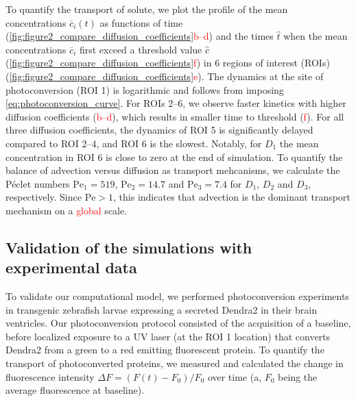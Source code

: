 \documentclass[fleqn]{wlscirep}
\newcommand{\cbar}{\overline{c}}
\newcommand{\fixme}[1]{\textcolor{red}{#1}}
\begin{document}
To quantify the transport of solute, we plot the profile of the mean
concentrations $\cbar_i(t)$ as functions of time
(\cref{fig:figure2_compare_diffusion_coefficients}\fixme{b--d}) and
the times $\hat{t}$ when the mean concentrations $\cbar_i$ first exceed
a threshold value $\hat{c}$ (\cref{fig:figure2_compare_diffusion_coefficients}\fixme{f})
in 6 regions of interest (ROIs) (\cref{fig:figure2_compare_diffusion_coefficients}\fixme{e}).
The dynamics at the site of photoconversion (ROI 1)
is logarithmic and follows from imposing \eqref{eq:photoconversion_curve}.
For ROIs 2--6, we observe faster kinetics with higher diffusion coefficients
(\fixme{b--d}),
which results in smaller time to threshold
(\fixme{f}).
For all three diffusion coefficients, the dynamics of ROI 5
is significantly delayed compared to ROI 2--4,
and ROI 6 is the slowest. Notably, for $D_1$ the mean concentration
in ROI 6 is close to zero at the end of simulation.
To quantify the balance of advection versus diffusion as transport mehcanisms,
we calculate the Péclet numbers $\mathrm{Pe}_1=519$,
$\mathrm{Pe}_2=14.7$ and $\mathrm{Pe}_3=7.4$ for $D_1$, $D_2$ and $D_3$, respectively.
Since $\mathrm{Pe}>1$, this indicates that advection is the
dominant transport mechanism on a \fixme{global} scale.
 
\subsection*{Validation of the simulations with experimental data}
To validate our computational model, we performed photoconversion experiments
in transgenic zebrafish larvae expressing a secreted Dendra2 in their brain ventricles.
Our photoconversion protocol consisted of the acquisition of a baseline,
before localized exposure to a UV laser (at the ROI 1 location)
that converts Dendra2 from a green to a red emitting fluorescent protein. 
To quantify the transport of photoconverted proteins, we measured and
calculated the change in fluorescence intensity $\Delta F = (F(t)-F_0)/F_0$
over time (a,
$F_0$ being the average fluorescence at baseline). 
\end{document}
